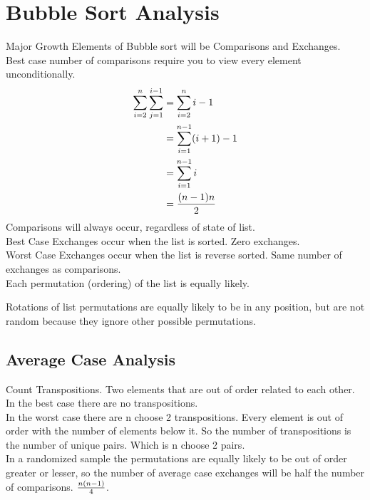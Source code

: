 \documentclass[english, 10pt]{article}
\begin{document}
\section{Bubble Sort Analysis}
\begin{algorithm}
\end{algorithm}

Major Growth Elements of Bubble sort will be Comparisons and Exchanges.\\

Best case number of comparisons require you to view every element unconditionally. \\
\begin{align*}
    \sum_{i=2}^n \sum_{j=1}^{i-1} &= \sum_{i=2}^{n} i-1 \\
    &= \sum_{i=1}^{n-1} (i+1) -1 \\
    &= \sum_{i=1}^{n-1} i \\
    &= \frac{(n-1)n}{2}
\end{align*}
Comparisons will always occur, regardless of state of list. \\

Best Case Exchanges occur when the list is sorted. Zero exchanges. \\
Worst Case Exchanges occur when the list is reverse sorted. Same number of exchanges as comparisons. \\

 Each permutation (ordering) of the list is equally likely.

    Rotations of list permutations are equally likely to be in any position, but are not random because they ignore other possible permutations.\\

\subsection{Average Case Analysis}
Count Transpositions. Two elements that are out of order related to each other. \\

In the best case there are no transpositions. \\
In the worst case there are n choose 2 transpositions. Every element is out of order with the number of elements below it.
So the number of transpositions is the number of unique pairs. Which is n choose 2 pairs. \\
In a randomized sample the permutations are equally likely to be out of order greater or lesser,
so the number of average case exchanges will be half the number of comparisons. $\frac{n(n-1)}{4}$.
\end{document}
